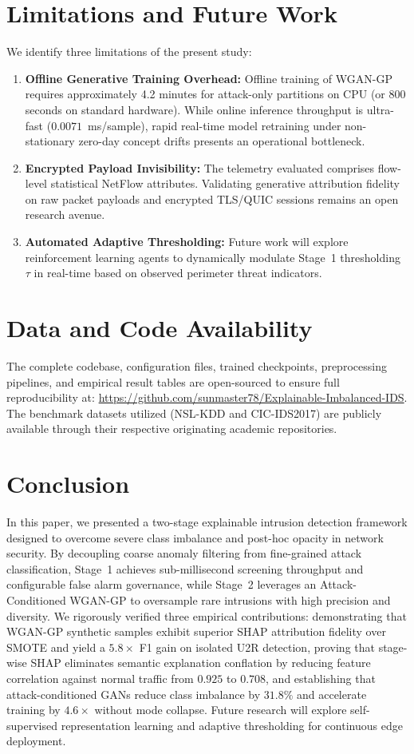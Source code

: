 \documentclass[journal]{IEEEtran}
\begin{document}
\section{Limitations and Future Work}
\label{sec:limitations}
We identify three limitations of the present study:
\begin{enumerate}
    \item \textbf{Offline Generative Training Overhead:} Offline training of WGAN-GP requires approximately 4.2 minutes for attack-only partitions on CPU (or 800 seconds on standard hardware). While online inference throughput is ultra-fast ($0.0071$~ms/sample), rapid real-time model retraining under non-stationary zero-day concept drifts presents an operational bottleneck.
    \item \textbf{Encrypted Payload Invisibility:} The telemetry evaluated comprises flow-level statistical NetFlow attributes. Validating generative attribution fidelity on raw packet payloads and encrypted TLS/QUIC sessions remains an open research avenue.
    \item \textbf{Automated Adaptive Thresholding:} Future work will explore reinforcement learning agents to dynamically modulate Stage~1 thresholding $\tau$ in real-time based on observed perimeter threat indicators.
\end{enumerate}

\section{Data and Code Availability}
\label{sec:availability}
The complete codebase, configuration files, trained checkpoints, preprocessing pipelines, and empirical result tables are open-sourced to ensure full reproducibility at: \url{https://github.com/sunmaster78/Explainable-Imbalanced-IDS}. The benchmark datasets utilized (NSL-KDD and CIC-IDS2017) are publicly available through their respective originating academic repositories.

\section{Conclusion}
\label{sec:conclusion}
In this paper, we presented a two-stage explainable intrusion detection framework designed to overcome severe class imbalance and post-hoc opacity in network security. By decoupling coarse anomaly filtering from fine-grained attack classification, Stage~1 achieves sub-millisecond screening throughput and configurable false alarm governance, while Stage~2 leverages an Attack-Conditioned WGAN-GP to oversample rare intrusions with high precision and diversity. We rigorously verified three empirical contributions: demonstrating that WGAN-GP synthetic samples exhibit superior SHAP attribution fidelity over SMOTE and yield a $5.8\times$ F1 gain on isolated U2R detection, proving that stage-wise SHAP eliminates semantic explanation conflation by reducing feature correlation against normal traffic from $0.925$ to $0.708$, and establishing that attack-conditioned GANs reduce class imbalance by $31.8\%$ and accelerate training by $4.6\times$ without mode collapse. Future research will explore self-supervised representation learning and adaptive thresholding for continuous edge deployment.



\end{document}
